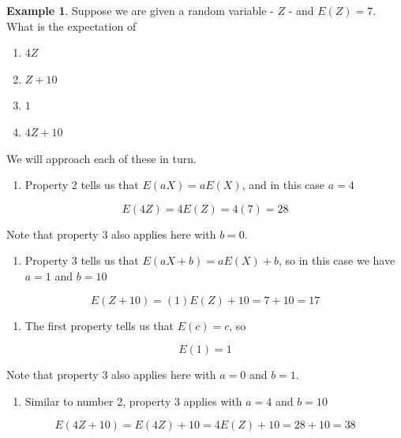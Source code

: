 \documentclass[
]{book}
\providecommand{\tightlist}{%
  \setlength{\itemsep}{0pt}\setlength{\parskip}{0pt}}
\theoremstyle{definition}
\theoremstyle{definition}
\newtheorem{example}{Example}[chapter]
\theoremstyle{definition}
\theoremstyle{definition}
\theoremstyle{remark}
\begin{document}
\begin{example}
Suppose we are given a random variable - \(Z\) - and \(E(Z) = 7\). What is the expectation of

\begin{enumerate}
\def\labelenumi{\arabic{enumi}.}
\item
  \(4Z\)
\item
  \(Z + 10\)
\item
  \(1\)
\item
  \(4Z+10\)
\end{enumerate}

We will approach each of these in turn.

\begin{enumerate}
\def\labelenumi{\arabic{enumi}.}
\tightlist
\item
  Property 2 tells us that \(E(aX) = aE(X)\), and in this case \(a = 4\)
\end{enumerate}

\[
E(4Z) = 4E(Z) = 4(7) = 28
\]

Note that property 3 also applies here with \(b = 0\).

\begin{enumerate}
\def\labelenumi{\arabic{enumi}.}
\setcounter{enumi}{1}
\tightlist
\item
  Property 3 tells us that \(E(aX + b) = aE(X) + b\), so in this case we have \(a = 1\) and \(b = 10\)
\end{enumerate}

\[
E(Z + 10) = (1)E(Z) + 10 = 7 + 10 = 17
\]

\begin{enumerate}
\def\labelenumi{\arabic{enumi}.}
\setcounter{enumi}{2}
\tightlist
\item
  The first property tells us that \(E(c) = c\), so
\end{enumerate}

\[
E(1) = 1
\]

Note that property 3 also applies here with \(a = 0\) and \(b = 1\).

\begin{enumerate}
\def\labelenumi{\arabic{enumi}.}
\setcounter{enumi}{3}
\tightlist
\item
  Similar to number 2, property 3 applies with \(a = 4\) and \(b = 10\)
\end{enumerate}

\[
E(4Z + 10) = E(4Z) + 10 = 4E(Z) + 10 = 28 + 10 = 38
\]
\end{example}
\end{document}
